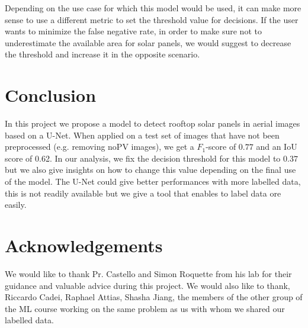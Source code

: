 \documentclass[10pt,conference]{IEEEtran}
\begin{document}
Depending on the use case for which this model would be used, it can make more sense to use a different metric to set the threshold value for decisions. If the user wants to minimize the false negative rate, in order to make sure not to underestimate the available area for solar panels, we would suggest to decrease the threshold and increase it in the opposite scenario.


\section{Conclusion}
In this project we propose a model to detect rooftop solar panels in aerial images based on a U-Net. When applied on a test set of images that have not been preprocessed (e.g. removing noPV images), we get a $F_1$-score of $0.77$ and an IoU score of 0.62. 
In our analysis, we fix the decision threshold for this model to $0.37$ but we also give insights on how to change this value depending on the final use of the model.
The U-Net could give better performances with more labelled data, this is not readily available but we give a tool that enables to label data ore easily.

\section*{Acknowledgements}
We would like to thank Pr. Castello and Simon Roquette from his lab for their guidance and valuable advice during this project. We would also like to thank, Riccardo Cadei, Raphael Attias, Shasha Jiang, the members of the other group of the ML course working on the same problem as us with whom we shared our labelled data.


\end{document}
